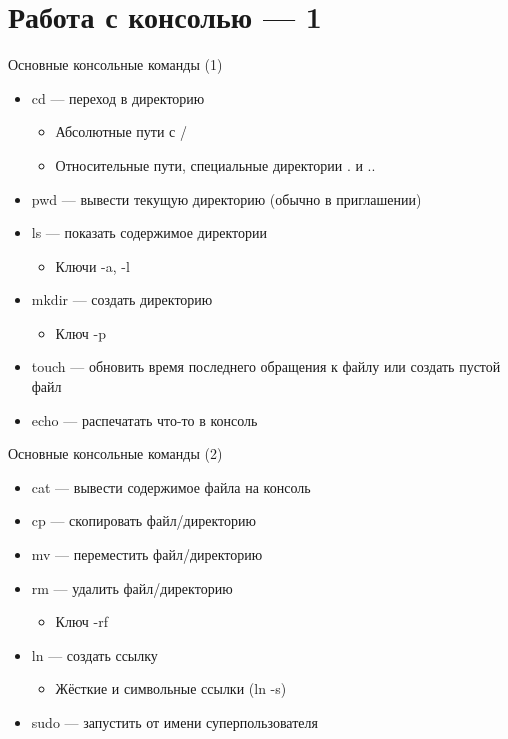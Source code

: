 \documentclass{../../slides-style}
\begin{document}
    \section{Работа с консолью --- 1}

    \begin{frame}{Основные консольные команды (1)}
        \begin{itemize}
            \item cd --- переход в директорию
            \begin{itemize}
                \item Абсолютные пути с /
                \item Относительные пути, специальные директории . и ..
            \end{itemize}
            \item pwd --- вывести текущую директорию (обычно в приглашении)
            \item ls --- показать содержимое директории
            \begin{itemize}
                \item Ключи -a, -l
            \end{itemize}
            \item mkdir --- создать директорию
            \begin{itemize}
                \item Ключ -p
            \end{itemize}
            \item touch --- обновить время последнего обращения к файлу или создать пустой файл
            \item echo --- распечатать что-то в консоль
        \end{itemize}
    \end{frame}

    \begin{frame}{Основные консольные команды (2)}
        \begin{itemize}
            \item cat --- вывести содержимое файла на консоль
            \item cp --- скопировать файл/директорию
            \item mv --- переместить файл/директорию
            \item rm --- удалить файл/директорию
            \begin{itemize}
                \item Ключ -rf
            \end{itemize}
            \item ln --- создать ссылку
            \begin{itemize}
                \item Жёсткие и символьные ссылки (ln -s)
            \end{itemize}
            \item sudo --- запустить от имени суперпользователя
        \end{itemize}
    \end{frame}
\end{document}
